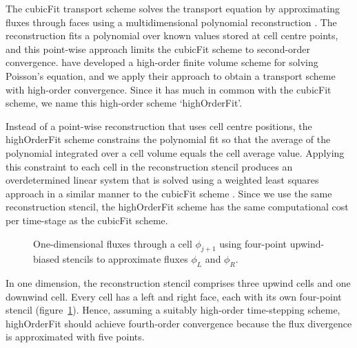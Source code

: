 \documentclass[a4paper,11pt]{article}
\begin{document}
The cubicFit transport scheme solves the transport equation by approximating fluxes through faces using a multidimensional polynomial reconstruction \citep{shaw2017}.
The reconstruction fits a polynomial over known values stored at cell centre points, and this point-wise approach limits the cubicFit scheme to second-order convergence.
\citet{devendran2017} have developed a high-order finite volume scheme for solving Poisson's equation, and we apply their approach to obtain a transport scheme with high-order convergence.
Since it has much in common with the cubicFit scheme, we name this high-order scheme `highOrderFit'. 

Instead of a point-wise reconstruction that uses cell centre positions, the highOrderFit scheme constrains the polynomial fit so that the average of the polynomial integrated over a cell volume equals the cell average value.
Applying this constraint to each cell in the reconstruction stencil produces an overdetermined linear system that is solved using a weighted least squares approach in a similar manner to the cubicFit scheme \citep{shaw2017}.
Since we use the same reconstruction stencil, the highOrderFit scheme has the same computational cost per time-stage as the cubicFit scheme.

\begin{figure}
	\centering
	\caption{One-dimensional fluxes through a cell $\phi_{j+1}$ using four-point upwind-biased stencils to approximate fluxes $\phi_L$ and $\phi_R$.}
	\label{fig:1d-stencil}
\end{figure}

In one dimension, the reconstruction stencil comprises three upwind cells and one downwind cell.
Every cell has a left and right face, each with its own four-point stencil (figure~\ref{fig:1d-stencil}).
Hence, assuming a suitably high-order time-stepping scheme, highOrderFit should achieve fourth-order convergence because the flux divergence is approximated with five points.
\end{document}
